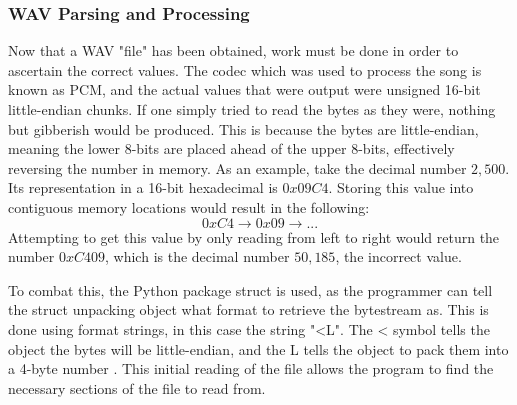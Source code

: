 \documentclass[UTF8, 12pt]{article}
\begin{document}
\subsubsection{WAV Parsing and Processing}
    Now that a WAV "file" has been obtained, work must be done in order to ascertain the correct values. The codec which was used to process the song is known as PCM, and the actual values that were output were unsigned 16-bit little-endian chunks. If one simply tried to read the bytes as they were, nothing but gibberish would be produced. This is because the bytes are little-endian, meaning the lower 8-bits are placed ahead of the upper 8-bits, effectively reversing the number in memory. As an example, take the decimal number \(2,500\). Its representation in a 16-bit hexadecimal is \(0x09C4\). Storing this value into contiguous memory locations would result in the following:
    \begin{equation*}
        0xC4 \to 0x09 \to ...
    \end{equation*}
    Attempting to get this value by only reading from left to right would return the number \(0xC409\), which is the decimal number \(50,185\), the incorrect value.

    To combat this, the Python package struct is used, as the programmer can tell the struct unpacking object what format to retrieve the bytestream as. This is done using format strings, in this case the string "<L". The < symbol tells the object the bytes will be little-endian, and the L tells the object to pack them into a 4-byte number \cite{struct}. This initial reading of the file allows the program to find the necessary sections of the file to read from.
\end{document}

